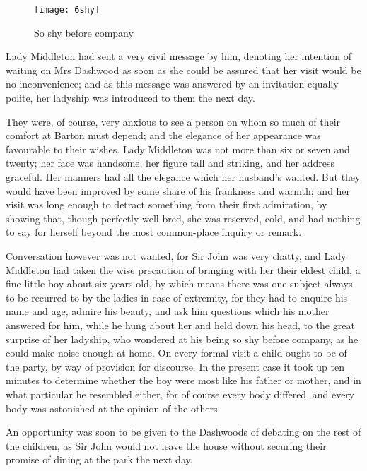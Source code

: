 \begin{figure}[tbh]
\centering
\texttt{[image: 6shy]}
\caption{So shy before company}
\end{figure}

Lady Middleton had sent a very civil message by him, denoting her intention of waiting on Mrs Dashwood as soon as she could be assured that her visit would be no inconvenience; and as this message was answered by an invitation equally polite, her ladyship was introduced to them the next day.

They were, of course, very anxious to see a person on whom so much of their comfort at Barton must depend; and the elegance of her appearance was favourable to their wishes. Lady Middleton was not more than six or seven and twenty; her face was handsome, her figure tall and striking, and her address graceful. Her manners had all the elegance which her husband’s wanted. But they would have been improved by some share of his frankness and warmth; and her visit was long enough to detract something from their first admiration, by showing that, though perfectly well-bred, she was reserved, cold, and had nothing to say for herself beyond the most common-place inquiry or remark.

Conversation however was not wanted, for Sir John was very chatty, and Lady Middleton had taken the wise precaution of bringing with her their eldest child, a fine little boy about six years old, by which means there was one subject always to be recurred to by the ladies in case of extremity, for they had to enquire his name and age, admire his beauty, and ask him questions which his mother answered for him, while he hung about her and held down his head, to the great surprise of her ladyship, who wondered at his being so shy before company, as he could make noise enough at home. On every formal visit a child ought to be of the party, by way of provision for discourse. In the present case it took up ten minutes to determine whether the boy were most like his father or mother, and in what particular he resembled either, for of course every body differed, and every body was astonished at the opinion of the others.

An opportunity was soon to be given to the Dashwoods of debating on the rest of the children, as Sir John would not leave the house without securing their promise of dining at the park the next day.